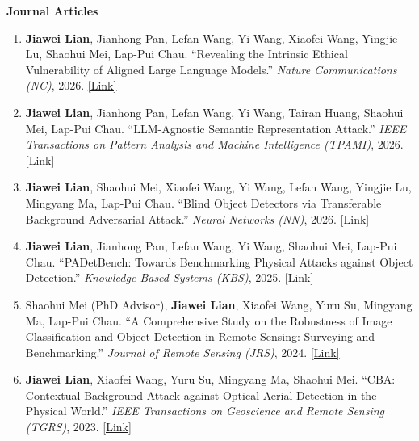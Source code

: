 
{\large\bfseries\sffamily\hspace{3pt}Journal Articles}
\begin{enumerate}
\item \textbf{Jiawei Lian}, Jianhong Pan, Lefan Wang, Yi Wang, Xiaofei Wang, Yingjie Lu, Shaohui Mei, Lap-Pui Chau. ``Revealing the Intrinsic Ethical Vulnerability of Aligned Large Language Models.'' \textit{Nature Communications (NC)}, 2026. 
\href{https://www.nature.com/articles/s41467-026-70917-y}{[Link]}

\item \textbf{Jiawei Lian}, Jianhong Pan, Lefan Wang, Yi Wang, Tairan Huang, Shaohui Mei, Lap-Pui Chau. ``LLM-Agnostic Semantic Representation Attack.'' \textit{IEEE Transactions on Pattern Analysis and Machine Intelligence (TPAMI)}, 2026.
\href{https://arxiv.org/abs/2605.08898}{[Link]}

\item \textbf{Jiawei Lian}, Shaohui Mei, Xiaofei Wang, Yi Wang, Lefan Wang, Yingjie Lu, Mingyang Ma, Lap-Pui Chau. ``Blind Object Detectors via Transferable Background Adversarial Attack.'' \textit{Neural Networks (NN)}, 2026.
\href{https://www.sciencedirect.com/science/article/pii/S0893608026008154}{[Link]}

\item \textbf{Jiawei Lian}, Jianhong Pan, Lefan Wang, Yi Wang, Shaohui Mei, Lap-Pui Chau. ``PADetBench: Towards Benchmarking Physical Attacks against Object Detection.'' \textit{Knowledge-Based Systems (KBS)}, 2025.
\href{https://www.sciencedirect.com/science/article/abs/pii/S0950705125014340}{[Link]}

\item Shaohui Mei (PhD Advisor), \textbf{Jiawei Lian}, Xiaofei Wang, Yuru Su, Mingyang Ma, Lap-Pui Chau. ``A Comprehensive Study on the Robustness of Image Classification and Object Detection in Remote Sensing: Surveying and Benchmarking.'' \textit{Journal of Remote Sensing (JRS)}, 2024. 
\href{https://spj.science.org/doi/full/10.34133/remotesensing.0219}{[Link]}

\item \textbf{Jiawei Lian}, Xiaofei Wang, Yuru Su, Mingyang Ma, Shaohui Mei. ``CBA: Contextual Background Attack against Optical Aerial Detection in the Physical World.'' \textit{IEEE Transactions on Geoscience and Remote Sensing (TGRS)}, 2023.
\href{https://ieeexplore.ieee.org/abstract/document/10092807}{[Link]}


\end{enumerate}

